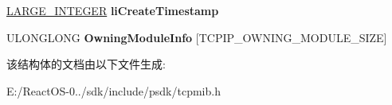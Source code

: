 \begin{DoxyCompactItemize}
\mbox{\label{struct___m_i_b___t_c_p_r_o_w___o_w_n_e_r___m_o_d_u_l_e_a20afe47b88db85b6c887b687576afdf3}} 
\hyperlink{union___l_a_r_g_e___i_n_t_e_g_e_r}{L\+A\+R\+G\+E\+\_\+\+I\+N\+T\+E\+G\+ER} {\bfseries li\+Create\+Timestamp}
\item 
\mbox{\label{struct___m_i_b___t_c_p_r_o_w___o_w_n_e_r___m_o_d_u_l_e_ab201ae516bd94ec48a5b43e0f8ee67d4}} 
U\+L\+O\+N\+G\+L\+O\+NG {\bfseries Owning\+Module\+Info} \mbox{[}T\+C\+P\+I\+P\+\_\+\+O\+W\+N\+I\+N\+G\+\_\+\+M\+O\+D\+U\+L\+E\+\_\+\+S\+I\+ZE\mbox{]}
\end{DoxyCompactItemize}


该结构体的文档由以下文件生成\+:\begin{DoxyCompactItemize}
\item 
E\+:/\+React\+O\+S-\/0../sdk/include/psdk/tcpmib.\+h\end{DoxyCompactItemize}

